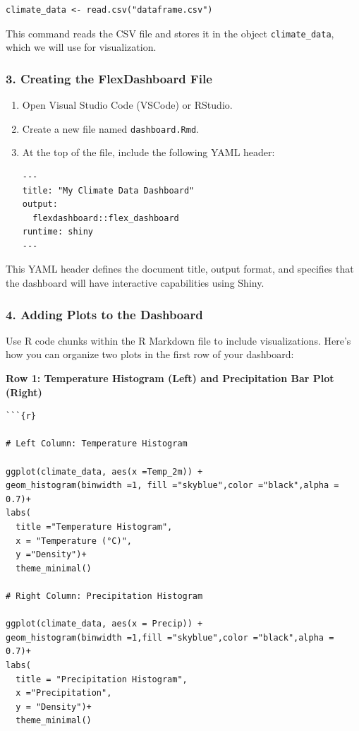 \begin{verbatim}
climate_data <- read.csv("dataframe.csv")
\end{verbatim}

This command reads the CSV file and stores it in the object \texttt{climate\_data}, which we will use for visualization.

\subsubsection*{3. Creating the FlexDashboard File}
\begin{enumerate}
  \item Open Visual Studio Code (VSCode) or RStudio. 
  \item Create a new file named \texttt{dashboard.Rmd}.

  \item At the top of the file, include the following YAML header:

\begin{verbatim}
---
title: "My Climate Data Dashboard"
output: 
  flexdashboard::flex_dashboard
runtime: shiny
---
\end{verbatim}
\end{enumerate}
This YAML header defines the document title, output format, and specifies that the dashboard will have interactive capabilities using Shiny.

\subsubsection*{4. Adding Plots to the Dashboard}

Use R code chunks within the R Markdown file to include visualizations. Here’s how you can organize two plots in the first row of your dashboard:

\textbf{Row 1: Temperature Histogram (Left) and Precipitation Bar Plot (Right)}

\begin{verbatim}
```{r}

# Left Column: Temperature Histogram

ggplot(climate_data, aes(x =Temp_2m)) +
geom_histogram(binwidth =1, fill ="skyblue",color ="black",alpha = 0.7)+
labs(
  title ="Temperature Histogram", 
  x = "Temperature (°C)", 
  y ="Density")+
  theme_minimal()

# Right Column: Precipitation Histogram

ggplot(climate_data, aes(x = Precip)) +
geom_histogram(binwidth =1,fill ="skyblue",color ="black",alpha = 0.7)+
labs(
  title = "Precipitation Histogram",
  x ="Precipitation",
  y = "Density")+
  theme_minimal()

\end{verbatim}

